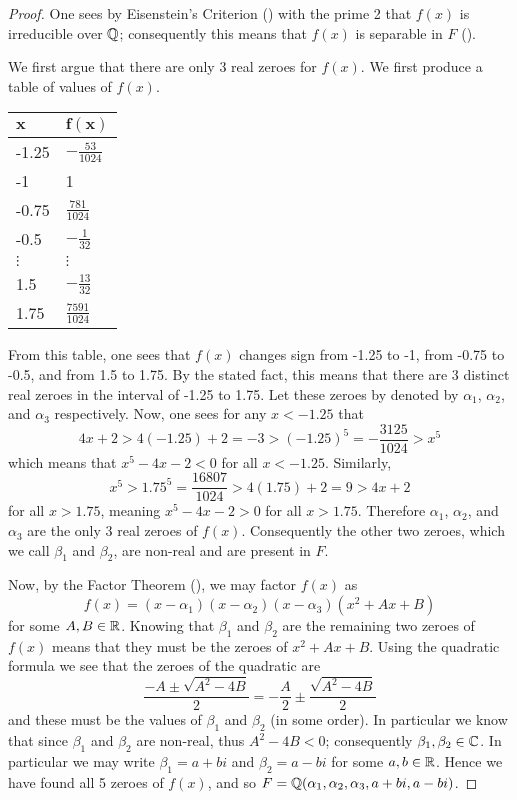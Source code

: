 \begin{proof}
    One sees by Eisenstein's Criterion () with the prime 2 that $f(x)$ is irreducible over $\mathbb{Q}$; consequently this means that $f(x)$ is separable in $F$ ().

    We first argue that there are only 3 real zeroes for $f(x)$. We first produce a table of values of $f(x)$.
    \begin{table}[H]
        \centering
        \begin{tabular}{|l|l|}
            \hline
            $\boldsymbol{x}$ & $\boldsymbol{f(x)}$ \\ \hline
            -1.25 & $-\frac{53}{1024}$ \\ \hline
            -1 & 1 \\ \hline
            -0.75 & $\frac{781}{1024}$ \\ \hline
            -0.5 & $-\frac1{32}$ \\ \hline
            $\vdots$ & $\vdots$ \\ \hline
            1.5 & $-\frac{13}{32}$ \\ \hline
            1.75 & $\frac{7591}{1024}$ \\ \hline
        \end{tabular}
    \end{table}
    From this table, one sees that $f(x)$ changes sign from -1.25 to -1, from -0.75 to -0.5, and from 1.5 to 1.75. By the stated fact, this means that there are 3 distinct real zeroes in the interval of -1.25 to 1.75. Let these zeroes by denoted by $\alpha_1$, $\alpha_2$, and $\alpha_3$ respectively. Now, one sees for any $x < -1.25$ that
    \[
        4x + 2 > 4(-1.25) + 2 = -3 > (-1.25)^5 = -\frac{3125}{1024} > x^5
    \]
    which means that $x^5 - 4x - 2 < 0$ for all $x < -1.25$. Similarly,
    \[
        x^5 > 1.75^5 = \frac{16807}{1024} > 4(1.75) + 2 = 9 > 4x + 2
    \]
    for all $x > 1.75$, meaning $x^5 - 4x - 2 > 0$ for all $x > 1.75$. Therefore $\alpha_1$, $\alpha_2$, and $\alpha_3$ are the only 3 real zeroes of $f(x)$. Consequently the other two zeroes, which we call $\beta_1$ and $\beta_2$, are non-real and are present in $F$.

    Now, by the Factor Theorem (), we may factor $f(x)$ as
    \[
        f(x) = (x-\alpha_1)(x-\alpha_2)(x-\alpha_3)(x^2 + Ax + B)
    \]
    for some $A, B \in \mathbb{R}$. Knowing that $\beta_1$ and $\beta_2$ are the remaining two zeroes of $f(x)$ means that they must be the zeroes of $x^2 + Ax + B$. Using the quadratic formula we see that the zeroes of the quadratic are
    \[
        \frac{-A\pm\sqrt{A^2 - 4B}}{2} = -\frac{A}{2} \pm \frac{\sqrt{A^2-4B}}2
    \]
    and these must be the values of $\beta_1$ and $\beta_2$ (in some order). In particular we know that since $\beta_1$ and $\beta_2$ are non-real, thus $A^2 - 4B < 0$; consequently $\beta_1, \beta_2 \in \mathbb{C}$. In particular we may write $\beta_1 = a + bi$ and $\beta_2 = a-bi$ for some $a, b \in \mathbb{R}$. Hence we have found all 5 zeroes of $f(x)$, and so $F = \mathbb{Q}(\alpha_1, \alpha_2, \alpha_3, a+bi, a-bi)$.


\end{proof}
